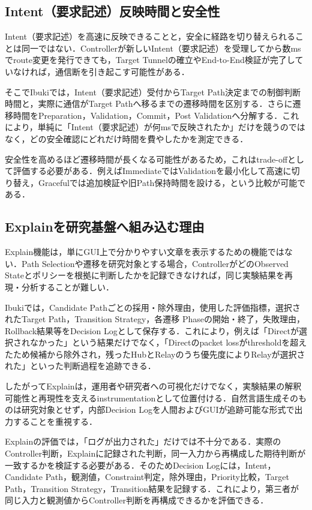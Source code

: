 \documentclass[11pt,a4paper,twoside]{ltjsarticle}
\begin{document}
\subsection{Intent（要求記述）反映時間と安全性}

Intent（要求記述）を高速に反映できることと，安全に経路を切り替えられることは同一ではない．Controllerが新しいIntent（要求記述）を受理してから数msでroute変更を発行できても，Target Tunnelの確立やEnd-to-End検証が完了していなければ，通信断を引き起こす可能性がある．

そこでIbukiでは，Intent（要求記述）受付からTarget Path決定までの制御判断時間と，実際に通信がTarget Pathへ移るまでの遷移時間を区別する．さらに遷移時間をPreparation，Validation，Commit，Post Validationへ分解する．これにより，単純に「Intent（要求記述）が何msで反映されたか」だけを競うのではなく，どの安全確認にどれだけ時間を費やしたかを測定できる．

安全性を高めるほど遷移時間が長くなる可能性があるため，これはtrade-offとして評価する必要がある．例えばImmediateではValidationを最小化して高速に切り替え，Gracefulでは追加検証や旧Path保持時間を設ける，という比較が可能である．

\subsection{Explainを研究基盤へ組み込む理由}

Explain機能は，単にGUI上で分かりやすい文章を表示するための機能ではない．Path Selectionや遷移を研究対象とする場合，ControllerがどのObserved Stateとポリシーを根拠に判断したかを記録できなければ，同じ実験結果を再現・分析することが難しい．

Ibukiでは，Candidate Pathごとの採用・除外理由，使用した評価指標，選択されたTarget Path，Transition Strategy，各遷移 Phaseの開始・終了，失敗理由，Rollback結果等をDecision Logとして保存する．これにより，例えば「Directが選択されなかった」という結果だけでなく，「Directのpacket lossがthresholdを超えたため候補から除外され，残ったHubとRelayのうち優先度によりRelayが選択された」といった判断過程を追跡できる．

したがってExplainは，運用者や研究者への可視化だけでなく，実験結果の解釈可能性と再現性を支えるinstrumentationとして位置付ける．自然言語生成そのものは研究対象とせず，内部Decision Logを人間およびGUIが追跡可能な形式で出力することを重視する．

Explainの評価では，「ログが出力された」だけでは不十分である．実際のController判断，Explainに記録された判断，同一入力から再構成した期待判断が一致するかを検証する必要がある．そのためDecision Logには，Intent，Candidate Path，観測値，Constraint判定，除外理由，Priority比較，Target Path，Transition Strategy，Transition結果を記録する．これにより，第三者が同じ入力と観測値からController判断を再構成できるかを評価できる．
\end{document}
